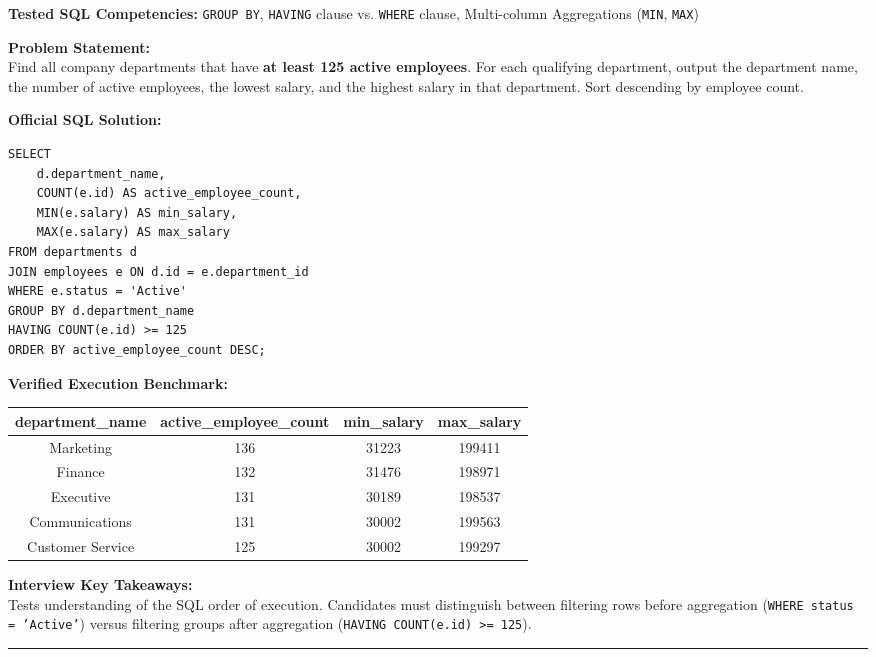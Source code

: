 \documentclass[11pt,a4paper]{article}
\begin{document}
\noindent\textbf{Tested SQL Competencies:} \texttt{GROUP BY}, \texttt{HAVING} clause vs. \texttt{WHERE} clause, Multi-column Aggregations (\texttt{MIN}, \texttt{MAX})

\vspace{0.15cm}
\noindent\textbf{Problem Statement:} \\
Find all company departments that have \textbf{at least 125 active employees}. For each qualifying department, output the department name, the number of active employees, the lowest salary, and the highest salary in that department. Sort descending by employee count.

\vspace{0.25cm}
\noindent\textbf{Official SQL Solution:}
\begin{verbatim}
SELECT 
    d.department_name,
    COUNT(e.id) AS active_employee_count,
    MIN(e.salary) AS min_salary,
    MAX(e.salary) AS max_salary
FROM departments d
JOIN employees e ON d.id = e.department_id
WHERE e.status = 'Active'
GROUP BY d.department_name
HAVING COUNT(e.id) >= 125
ORDER BY active_employee_count DESC;
\end{verbatim}

\vspace{0.15cm}
\noindent\textbf{Verified Execution Benchmark:}
\begin{center}
\small
\begin{tabular}{cccc}
\toprule
\textbf{department\_name} & \textbf{active\_employee\_count} & \textbf{min\_salary} & \textbf{max\_salary} \\
\midrule
Marketing & 136 & 31223 & 199411 \\
Finance & 132 & 31476 & 198971 \\
Executive & 131 & 30189 & 198537 \\
Communications & 131 & 30002 & 199563 \\
Customer Service & 125 & 30002 & 199297 \\
\bottomrule
\end{tabular}
\end{center}

\vspace{0.15cm}
\noindent\textbf{Interview Key Takeaways:} \\
Tests understanding of the SQL order of execution. Candidates must distinguish between filtering rows before aggregation (\texttt{WHERE status = 'Active'}) versus filtering groups after aggregation (\texttt{HAVING COUNT(e.id) >= 125}).

\vspace{0.4cm}
\noindent\rule{\textwidth}{0.4pt}
\vspace{0.4cm}
\end{document}

